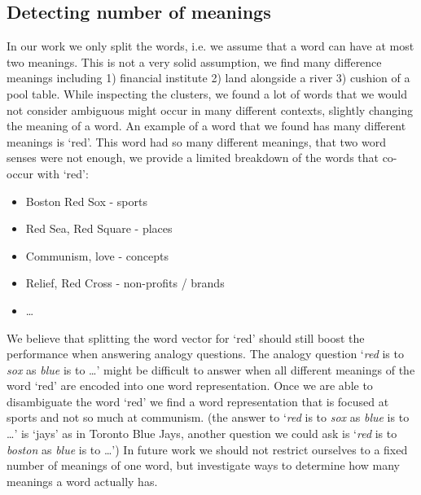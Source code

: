 \documentclass[11pt]{article}
\begin{document}
\subsection{Detecting number of meanings}
In our work we only split the words, i.e. we assume that a word can have at most two meanings. This is not a very solid assumption, we find many difference meanings including 1) financial institute 2) land alongside a river 3) cushion of a pool table. While inspecting the clusters, we found a lot of words that we would not consider ambiguous might occur in many different contexts, slightly changing the meaning of a word. An example of a word that we found has many different meanings is `red'. This word had so many different meanings, that two word senses were not enough, we provide a limited breakdown of the words that co-occur with `red':
\begin{itemize}
\item Boston Red Sox - sports
\item Red Sea, Red Square - places
\item Communism, love - concepts
\item Relief, Red Cross - non-profits / brands
\item \dots
\end{itemize} 
We believe that splitting the word vector for `red' should still boost the performance when answering analogy questions. The analogy question `\textit{red} is to \textit{sox} as \textit{blue} is to \dots' might be difficult to answer when all different meanings of the word `red' are encoded into one word representation. Once we are able to disambiguate the word `red' we find a word representation that is focused at sports and not so much at communism. (the answer to `\textit{red} is to \textit{sox} as \textit{blue} is to \dots' is `jays' as in Toronto Blue Jays, another question we could ask is `\textit{red} is to \textit{boston} as \textit{blue} is to \dots') In future work we should not restrict ourselves to a fixed number of meanings of one word, but investigate ways to determine how many meanings a word actually has. 
 
\end{document}
